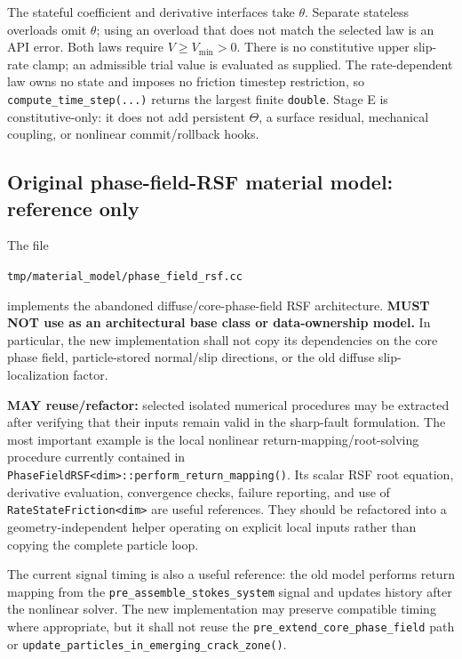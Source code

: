 \documentclass[11pt]{article}
\begin{document}
The stateful coefficient and derivative interfaces take $\theta$.  Separate
stateless overloads omit $\theta$; using an overload that does not match the
selected law is an API error.  Both laws require $V\geq V_{\min}>0$.  There is
no constitutive upper slip-rate clamp; an admissible trial value is evaluated
as supplied.  The rate-dependent law owns no state and imposes no friction
timestep restriction, so \texttt{compute\_time\_step(...)} returns the largest
finite \texttt{double}.  Stage E is constitutive-only: it does not add
persistent $\Theta$, a surface residual, mechanical coupling, or nonlinear
commit/rollback hooks.

\subsection{Original phase-field-RSF material model: reference only}
The file
\begin{center}
\texttt{tmp/material\_model/phase\_field\_rsf.cc}
\end{center}
implements the abandoned diffuse/core-phase-field RSF architecture.  \textbf{MUST NOT use as an architectural base class or data-ownership model.}  In particular, the new implementation shall not copy its dependencies on the core phase field, particle-stored normal/slip directions, or the old diffuse slip-localization factor.

\textbf{MAY reuse/refactor:} selected isolated numerical procedures may be extracted after verifying that their inputs remain valid in the sharp-fault formulation.  The most important example is the local nonlinear return-mapping/root-solving procedure currently contained in \texttt{PhaseFieldRSF<dim>::perform\_return\_mapping()}.  Its scalar RSF root equation, derivative evaluation, convergence checks, failure reporting, and use of \texttt{RateStateFriction<dim>} are useful references.  They should be refactored into a geometry-independent helper operating on explicit local inputs rather than copying the complete particle loop.

The current signal timing is also a useful reference: the old model performs return mapping from the \texttt{pre\_assemble\_stokes\_system} signal and updates history after the nonlinear solver.  The new implementation may preserve compatible timing where appropriate, but it shall not reuse the \texttt{pre\_extend\_core\_phase\_field} path or \texttt{update\_particles\_in\_emerging\_crack\_zone()}.
\end{document}
